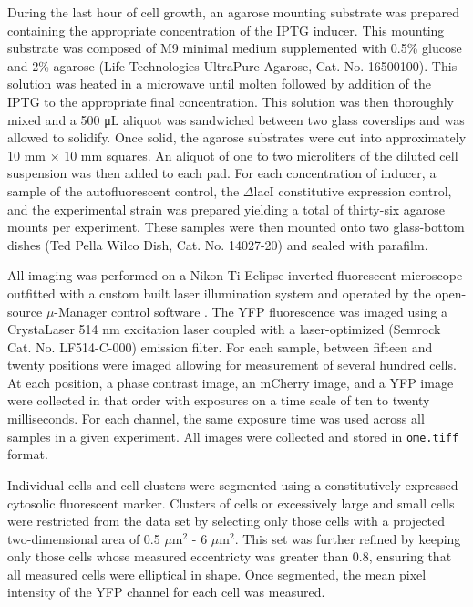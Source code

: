 \documentclass[letterpaper, 10pt]{article}
\begin{document}
During the last hour of cell growth, an agarose mounting substrate was prepared
containing the appropriate concentration of the IPTG inducer. This mounting
substrate was composed of M9 minimal medium supplemented with 0.5\% glucose and
2\% agarose (Life Technologies UltraPure Agarose, Cat. No. 16500100). This
solution was heated in a microwave until molten followed by addition of the
IPTG to the appropriate final concentration. This solution was then thoroughly
mixed and a 500 μL aliquot was sandwiched between two glass coverslips and was
allowed to solidify. Once solid, the agarose substrates were cut into
approximately 10 mm × 10 mm squares. An aliquot of one to two microliters of
the diluted cell suspension was then added to each pad. For each concentration
of inducer, a sample of the autofluorescent control, the $\Delta$lacI
constitutive expression control, and the experimental strain was prepared
yielding a total of thirty-six agarose mounts per experiment. These samples
were then mounted onto two glass-bottom dishes (Ted Pella Wilco Dish, Cat. No.
14027-20) and sealed with parafilm.

All imaging was performed on a Nikon Ti-Eclipse inverted fluorescent microscope
outfitted with a custom built laser illumination system and operated by the
open-source $\mu$-Manager control software \cite{Edelstein2014}. The YFP
fluorescence was imaged using a CrystaLaser 514 nm excitation laser coupled
with a laser-optimized (Semrock Cat. No. LF514-C-000) emission filter. For each
sample, between fifteen and twenty positions were imaged allowing for
measurement of several hundred cells. At each position, a phase contrast image,
an mCherry image, and a YFP image were collected in that order with exposures
on a time scale of ten to twenty milliseconds. For each channel, the same
exposure time was used across all samples in a given experiment. All images
were collected and stored in \texttt{ome.tiff} format.

Individual cells and cell clusters were segmented using a constitutively
expressed cytosolic fluorescent marker. Clusters of cells or excessively large
and small cells were restricted from the data set by selecting only those cells
with a projected two-dimensional area of 0.5 $\mu$m$^2$ - 6 $\mu$m$^2$. This set
was further refined by keeping only those cells whose measured eccentricty was
greater than 0.8, ensuring that all measured cells were elliptical in shape.
Once segmented, the mean pixel intensity of the YFP channel for each cell was
measured.
\end{document}
